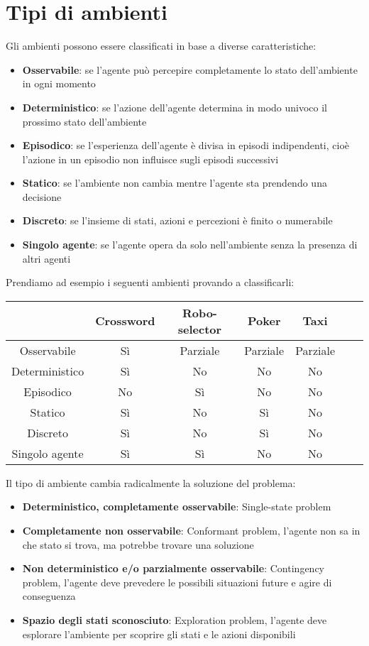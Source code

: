\documentclass[a4paper]{article}
\begin{document}
\section{Tipi di ambienti}
Gli ambienti possono essere classificati in base a diverse caratteristiche:
\begin{itemize}
  \item \textbf{Osservabile}: se l'agente può percepire completamente lo stato dell'ambiente
    in ogni momento
  \item \textbf{Deterministico}: se l'azione dell'agente determina in modo univoco il prossimo stato
    dell'ambiente
  \item \textbf{Episodico}: se l'esperienza dell'agente è divisa in episodi indipendenti,
    cioè l'azione in un episodio non influisce sugli episodi successivi
  \item \textbf{Statico}: se l'ambiente non cambia mentre l'agente sta prendendo una
    decisione
  \item \textbf{Discreto}: se l'insieme di stati, azioni e percezioni è finito o numerabile
  \item \textbf{Singolo agente}: se l'agente opera da solo nell'ambiente senza la presenza
    di altri agenti
\end{itemize}
\begin{example}
  Prendiamo ad esempio i seguenti ambienti provando a classificarli:
  \begin{table}[H]
    \centering
    \begin{tabular}{|c|c|c|c|c|c|c|}
      \hline
      & Crossword & Robo-selector & Poker & Taxi \\
      \hline
      Osservabile & Sì & Parziale & Parziale & Parziale \\
      Deterministico & Sì & No & No & No \\
      Episodico & No & Sì & No & No \\
      Statico & Sì & No & Sì & No \\
      Discreto & Sì & No & Sì & No \\
      Singolo agente & Sì & Sì & No & No \\
      \hline
    \end{tabular}
  \end{table}
\end{example}
Il tipo di ambiente cambia radicalmente la soluzione del problema:
\begin{itemize}
  \item \textbf{Deterministico, completamente osservabile}: Single-state problem
  \item \textbf{Completamente non osservabile}: Conformant problem, l'agente non sa in che
    stato si trova, ma potrebbe trovare una soluzione
  \item \textbf{Non deterministico e/o parzialmente osservabile}: Contingency problem,
    l'agente deve prevedere le possibili situazioni future e agire di conseguenza
  \item \textbf{Spazio degli stati sconosciuto}: Exploration problem, l'agente deve esplorare
    l'ambiente per scoprire gli stati e le azioni disponibili
\end{itemize}
\end{document}
